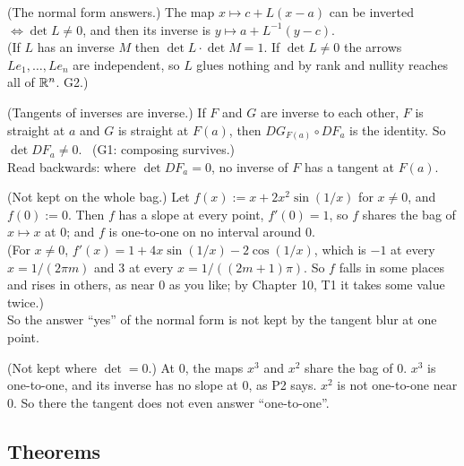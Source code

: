 \begin{lines}
\item[\lab{P1}] (The normal form answers.) The map $x \mapsto c + L(x - a)$ can be inverted $\iff \det L \neq 0$, and then its inverse is $y \mapsto a + L^{-1}(y - c)$. \\
(If $L$ has an inverse $M$ then $\det L \cdot \det M = 1$. If $\det L \neq 0$ the arrows $L e_1, \dots, L e_n$ are independent, so $L$ glues nothing and by rank and nullity reaches all of $\mathbb{R}^n$. G2.)
\item[\lab{P2}] (Tangents of inverses are inverse.) If $F$ and $G$ are inverse to each other, $F$ is straight at $a$ and $G$ is straight at $F(a)$, then $DG_{F(a)} \circ DF_a$ is the identity. So $\det DF_a \neq 0$. \ (G1: composing survives.) \\
Read backwards: where $\det DF_a = 0$, no inverse of $F$ has a tangent at $F(a)$.
\item[\lab{P3}] (Not kept on the whole bag.) Let $f(x) := x + 2x^2 \sin(1/x)$ for $x \neq 0$, and $f(0) := 0$. Then $f$ has a slope at every point, $f'(0) = 1$, so $f$ shares the bag of $x \mapsto x$ at $0$; and $f$ is one-to-one on no interval around $0$. \\
(For $x \neq 0$, $f'(x) = 1 + 4x \sin(1/x) - 2\cos(1/x)$, which is $-1$ at every $x = 1/(2\pi m)$ and $3$ at every $x = 1/((2m + 1)\pi)$. So $f$ falls in some places and rises in others, as near $0$ as you like; by Chapter 10, T1 it takes some value twice.) \\
So the answer ``yes'' of the normal form is not kept by the tangent blur at one point.
\item[\lab{P4}] (Not kept where $\det = 0$.) At $0$, the maps $x^3$ and $x^2$ share the bag of $0$. $x^3$ is one-to-one, and its inverse has no slope at $0$, as P2 says. $x^2$ is not one-to-one near $0$. So there the tangent does not even answer ``one-to-one''.
\end{lines}

\subsection*{Theorems}

